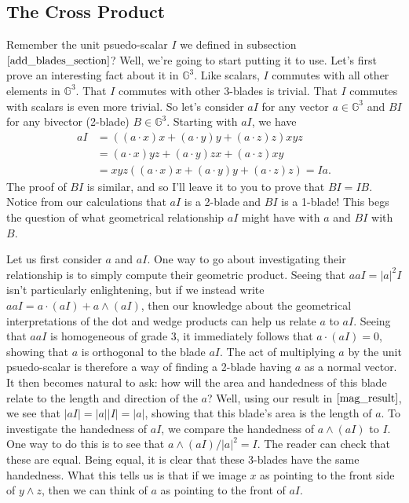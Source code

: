 \documentclass{article}
\newcommand{\G}{\mathbb{G}}
\begin{document}
\subsection{The Cross Product}

Remember the unit psuedo-scalar $I$ we defined in subsection $\eqref{add_blades_section}$?
Well, we're going to start putting it to use.
Let's first prove an interesting fact about it in $\G^3$.
Like scalars, $I$ commutes with all other elements in $\G^3$.
That $I$ commutes with other 3-blades is trivial.
That $I$ commutes with scalars is even more trivial.
So let's consider $aI$ for any vector $a\in\G^3$ and
$BI$ for any bivector (2-blade) $B\in\G^3$.  Starting with
$aI$, we have
\begin{align*}
aI &= ((a\cdot x)x+(a\cdot y)y+(a\cdot z)z)xyz \\
 &= (a\cdot x)yz+(a\cdot y)zx+(a\cdot z)xy \\
 &= xyz((a\cdot x)x+(a\cdot y)y+(a\cdot z)z) = Ia.
\end{align*}
The proof of $BI$ is similar, and so I'll leave it to you
to prove that $BI=IB$.  Notice from our calculations
that $aI$ is a 2-blade and $BI$ is a 1-blade!  This begs
the question of what geometrical relationship $aI$ might
have with $a$ and $BI$ with $B$.

Let us first consider $a$ and $aI$.  One way to go about
investigating their relationship is to simply compute
their geometric product.  Seeing that $aaI=|a|^2I$ isn't
particularly enlightening, but if we instead write
$aaI = a\cdot(aI)+a\wedge(aI)$, then our knowledge about
the geometrical interpretations of the dot and wedge products
can help us relate $a$ to $aI$.  Seeing that $aaI$ is
homogeneous of grade 3, it immediately follows that
$a\cdot(aI)=0$, showing that $a$ is orthogonal to the
blade $aI$.  The act of multiplying $a$ by
the unit psuedo-scalar is therefore a way of finding a
2-blade having $a$ as a normal vector.  It then becomes
natural to ask: how will the area and handedness of this
blade relate to the length and direction of the $a$?
Well, using our result in $\eqref{mag_result}$, we
see that $|aI| = |a||I| = |a|$,
showing that this blade's area is the length of $a$.
To investigate the handedness of $aI$, we compare
the handedness of $a\wedge(aI)$ to $I$.  One way
to do this is to see that $a\wedge(aI)/|a|^2=I$.
The reader can check that these are equal.  Being equal, it
is clear that these 3-blades have the same handedness.
What this tells us is that if we image $x$ as pointing
to the front side of $y\wedge z$, then we can think of
$a$ as pointing to the front of $aI$.
\end{document}
